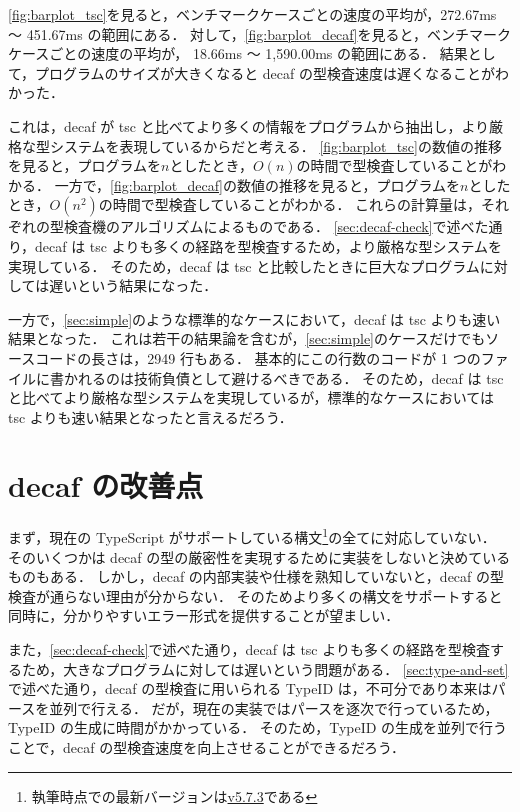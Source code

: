 \ref{fig:barplot_tsc}を見ると，ベンチマークケースごとの速度の平均が，272.67ms 〜 451.67ms の範囲にある．
対して，\ref{fig:barplot_decaf}を見ると，ベンチマークケースごとの速度の平均が， 18.66ms 〜 1,590.00ms の範囲にある．
結果として，プログラムのサイズが大きくなると decaf の型検査速度は遅くなることがわかった．

これは，decaf が tsc と比べてより多くの情報をプログラムから抽出し，より厳格な型システムを表現しているからだと考える．
\ref{fig:barplot_tsc}の数値の推移を見ると，プログラムを$n$としたとき，$O(n)$の時間で型検査していることがわかる．
一方で，\ref{fig:barplot_decaf}の数値の推移を見ると，プログラムを$n$としたとき，$O(n^2)$の時間で型検査していることがわかる．
これらの計算量は，それぞれの型検査機のアルゴリズムによるものである．
\ref{sec:decaf-check}で述べた通り，decaf は tsc よりも多くの経路を型検査するため，より厳格な型システムを実現している．
そのため，decaf は tsc と比較したときに巨大なプログラムに対しては遅いという結果になった．

一方で，\ref{sec:simple}のような標準的なケースにおいて，decaf は tsc よりも速い結果となった．
これは若干の結果論を含むが，\ref{sec:simple}のケースだけでもソースコードの長さは，2949 行もある．
基本的にこの行数のコードが 1 つのファイルに書かれるのは技術負債として避けるべきである．
そのため，decaf は tsc と比べてより厳格な型システムを実現しているが，標準的なケースにおいては tsc よりも速い結果となったと言えるだろう．

\section{decaf の改善点}

まず，現在の TypeScript がサポートしている構文\footnote{執筆時点での最新バージョンは\href{https://github.com/microsoft/TypeScript/tree/v5.7.3}{v5.7.3}である}の全てに対応していない．
そのいくつかは decaf の型の厳密性を実現するために実装をしないと決めているものもある．
しかし，decaf の内部実装や仕様を熟知していないと，decaf の型検査が通らない理由が分からない．
そのためより多くの構文をサポートすると同時に，分かりやすいエラー形式を提供することが望ましい．

また，\ref{sec:decaf-check}で述べた通り，decaf は tsc よりも多くの経路を型検査するため，大きなプログラムに対しては遅いという問題がある．
\ref{sec:type-and-set}で述べた通り，decaf の型検査に用いられる TypeID は，不可分であり本来はパースを並列で行える．
だが，現在の実装ではパースを逐次で行っているため，TypeID の生成に時間がかかっている．
そのため，TypeID の生成を並列で行うことで，decaf の型検査速度を向上させることができるだろう．
